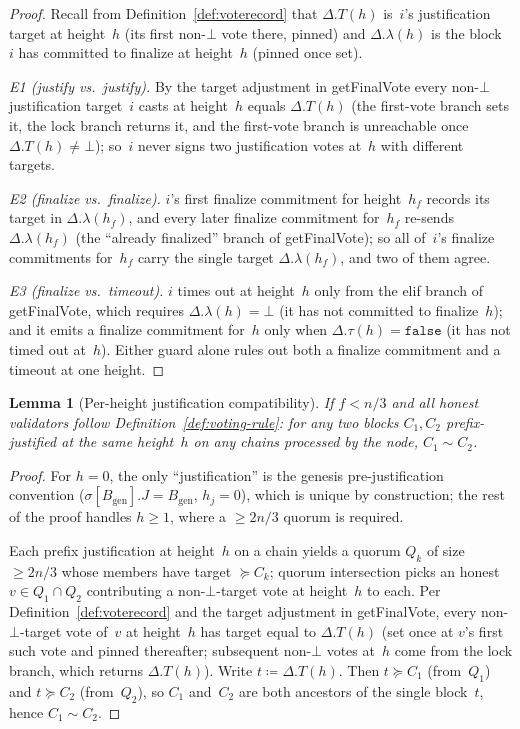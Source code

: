 \ifx\litemode\undefined\documentclass{article}\fi
\newcommand{\genesis}{\ensuremath{B_{\mathrm{gen}}}}
\newcommand{\getFinalVote}{\textsf{getFinalVote}\xspace}
\theoremstyle{plain}
\newtheorem{lemma}{Lemma}
\theoremstyle{definition}
\theoremstyle{remark}
\begin{document}
\begin{proof}
Recall from Definition~\ref{def:voterecord} that $\Delta.T(h)$ is~$i$'s justification target at height~$h$ (its first non-$\bot$ vote there, pinned) and $\Delta.\lambda(h)$ is the block~$i$ has committed to finalize at height~$h$ (pinned once set).

\emph{E1 (justify vs.\ justify).} By the target adjustment in \getFinalVote every non-$\bot$ justification target~$i$ casts at height~$h$ equals $\Delta.T(h)$ (the first-vote branch sets it, the lock branch returns it, and the first-vote branch is unreachable once $\Delta.T(h) \neq \bot$); so~$i$ never signs two justification votes at~$h$ with different targets.

\emph{E2 (finalize vs.\ finalize).} $i$'s first finalize commitment for height~$h_f$ records its target in $\Delta.\lambda(h_f)$, and every later finalize commitment for~$h_f$ re-sends $\Delta.\lambda(h_f)$ (the ``already finalized'' branch of \getFinalVote); so all of~$i$'s finalize commitments for~$h_f$ carry the single target $\Delta.\lambda(h_f)$, and two of them agree.

\emph{E3 (finalize vs.\ timeout).} $i$ times out at height~$h$ only from the elif branch of \getFinalVote, which requires $\Delta.\lambda(h) = \bot$ (it has not committed to finalize~$h$); and it emits a finalize commitment for~$h$ only when $\Delta.\tau(h) = \mathtt{false}$ (it has not timed out at~$h$). Either guard alone rules out both a finalize commitment and a timeout at one height.
\end{proof}

\begin{lemma}[Per-height justification compatibility]\label{lem:just-compat-height}
If $f < n/3$ and all honest validators follow Definition~\ref{def:voting-rule}: for any two blocks $C_1, C_2$ prefix-justified at the same height~$h$ on any chains processed by the node, $C_1 \sim C_2$.
\end{lemma}

\begin{proof}
For $h = 0$, the only ``justification'' is the genesis pre-justification convention ($\sigma[\genesis].J = \genesis$, $h_j = 0$), which is unique by construction; the rest of the proof handles $h \geq 1$, where a $\geq 2n/3$ quorum is required.

Each prefix justification at height~$h$ on a chain yields a quorum $Q_k$ of size $\geq 2n/3$ whose members have target $\succeq C_k$; quorum intersection picks an honest~$v \in Q_1 \cap Q_2$ contributing a non-$\bot$-target vote at height~$h$ to each.
Per Definition~\ref{def:voterecord} and the target adjustment in \getFinalVote, every non-$\bot$-target vote of~$v$ at height~$h$ has target equal to $\Delta.T(h)$ (set once at $v$'s first such vote and pinned thereafter; subsequent non-$\bot$ votes at~$h$ come from the lock branch, which returns $\Delta.T(h)$).
Write $t \coloneqq \Delta.T(h)$.
Then $t \succeq C_1$ (from~$Q_1$) and $t \succeq C_2$ (from~$Q_2$), so $C_1$ and~$C_2$ are both ancestors of the single block~$t$, hence $C_1 \sim C_2$.
\end{proof}
\end{document}
